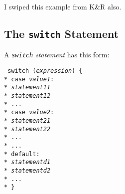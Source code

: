 \begin{flushleft}
\verb%  a = (x > y) ? y : x ; %
\end{flushleft}

I swiped this example from K\&R also.

\subsection{The {\tt switch} Statement}

A {\em {\tt switch} statement}\/ has this form:

\begin{flushleft}
\tt
switch ({\em expression}\/) \{ \\*
{\hspace{8pt}}case {\em value1}\/: \\*
{\hspace{8pt}}{\hspace{8pt}}{\em statement11}\/ \\*
{\hspace{8pt}}{\hspace{8pt}}{\em statement12}\/ \\*
{\hspace{8pt}}{\hspace{8pt}}... \\*
{\hspace{8pt}}case {\em value2}\/: \\*
{\hspace{8pt}}{\hspace{8pt}}{\em statement21}\/ \\*
{\hspace{8pt}}{\hspace{8pt}}{\em statement22}\/ \\*
{\hspace{8pt}}{\hspace{8pt}}... \\*
{\hspace{8pt}}... \\*
{\hspace{8pt}}default: \\*
{\hspace{8pt}}{\hspace{8pt}}{\em statementd1}\/ \\*
{\hspace{8pt}}{\hspace{8pt}}{\em statementd2}\/ \\*
{\hspace{8pt}}{\hspace{8pt}}... \\*
\} 
\end{flushleft}


